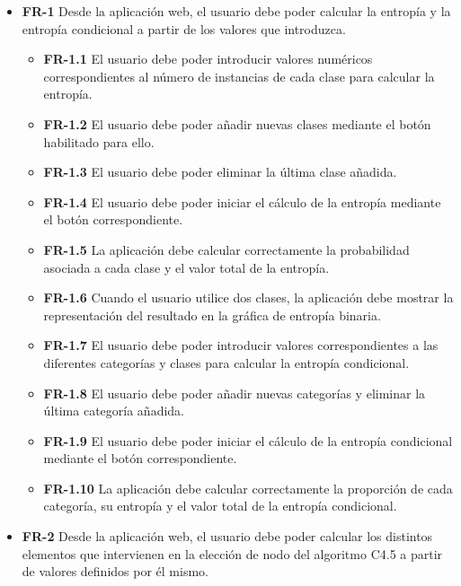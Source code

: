 \begin{itemize}
\item \textbf{FR-1} Desde la aplicación web, el usuario debe poder calcular la entropía y la entropía condicional a partir de los valores que introduzca.

\begin{itemize}
    \item \textbf{FR-1.1} El usuario debe poder introducir valores numéricos correspondientes al número de instancias de cada clase para calcular la entropía.

    \item \textbf{FR-1.2} El usuario debe poder añadir nuevas clases mediante el botón habilitado para ello.

    \item \textbf{FR-1.3} El usuario debe poder eliminar la última clase añadida.

    \item \textbf{FR-1.4} El usuario debe poder iniciar el cálculo de la entropía mediante el botón correspondiente.

    \item \textbf{FR-1.5} La aplicación debe calcular correctamente la probabilidad asociada a cada clase y el valor total de la entropía.

    \item \textbf{FR-1.6} Cuando el usuario utilice dos clases, la aplicación debe mostrar la representación del resultado en la gráfica de entropía binaria.

    \item \textbf{FR-1.7} El usuario debe poder introducir valores correspondientes a las diferentes categorías y clases para calcular la entropía condicional.

    \item \textbf{FR-1.8} El usuario debe poder añadir nuevas categorías y eliminar la última categoría añadida.

    \item \textbf{FR-1.9} El usuario debe poder iniciar el cálculo de la entropía condicional mediante el botón correspondiente.

    \item \textbf{FR-1.10} La aplicación debe calcular correctamente la proporción de cada categoría, su entropía y el valor total de la entropía condicional.
\end{itemize}

\item \textbf{FR-2} Desde la aplicación web, el usuario debe poder calcular los distintos elementos que intervienen en la elección de nodo del algoritmo C4.5 a partir de valores definidos por él mismo.


\end{itemize}
